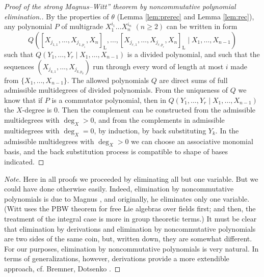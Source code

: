 \documentclass[11pt,a4paper]{amsart}
\newcommand{\snewpage}{}
\newcommand{\snewpage}{\newpage}
\newcommand{\snewpage}{}
\theoremstyle{definition}
\theoremstyle{plain}
\begin{document}
\begin{proof}[Proof of the strong Magnus--Witt'' theorem  by noncommutative polynomial elimination.]
By the properties of $\theta$ (Lemma \ref{lem:prerec} and Lemma \ref{lem:rec}),
 any  polynomial $P$ of multigrade $X_1^{i_1}\ldots X_n^{i_n}$ $(n\geq2)$ can be written in form
\[Q( [X_{j_{1,1}}, \ldots,X_{j_{1,p_1}} ,X_n]_{\mathrm L}, \ldots , [X_{j_{r,1}}, \ldots,X_{j_{r,p_r}} ,X_n]_{\mathrm L}
\mid X_1,\ldots,X_{n-1} )\]
 such that $Q(Y_1,\ldots,Y_r\mid X_1,\ldots,X_{n-1} )$ is a divided polynomial, and such that the
 sequences $(X_{j_{k,1}}, \ldots,X_{j_{k,p_k}}) $
 run through every word of length at most $i$ made from $\{X_1,\ldots,X_{n-1}\}$.
The allowed polynomials $Q$ are direct  sums of full admissible multidegrees of divided polynomials.
From the uniqueness of $Q$ we know that if $P$ is a commutator polynomial,
 then in $Q(Y_1,\ldots,Y_r\mid X_1,\ldots,X_{n-1} )$ the $X$-degree is $0$.
Then the complement can be constructed from the admissible multidegrees with $\deg_X>0$, and
 from the complements in admissible multidegrees with $\deg_X=0$, by induction, by back substituting $Y_k$.
In the  admissible multidegrees with $\deg_X>0$ we can choose an associative monomial basis,
 and the back substitution process is compatible to shape of bases indicated.
\end{proof}
 \renewcommand{\qedsymbol}{$\triangle$}
\begin{proof}[Note]
Here in all proofs we proceeded by eliminating all but one variable.
But we could have done otherwise easily.
Indeed, elimination by noncommutative polynomials is due to Magnus \cite{MM}, and originally, he eliminates only one variable.
(Witt \cite{W} uses the PBW theorem for free Lie algebras over fields first; and then,
the treatment of the integral case is more in group theoretic terms.)
It must be clear that elimination by derivations and elimination by noncommutative polynomials
 are two sides of the same coin, but, written down, they are somewhat different.
For our purposes, elimination by noncommutative polynomials is very natural.
In terms of generalizations, however, derivations provide a more extendible approach,
cf. Bremner, Dotsenko \cite{BD}.
\end{proof}
\renewcommand{\qedsymbol}{$\Box$}
\snewpage
\end{document}
